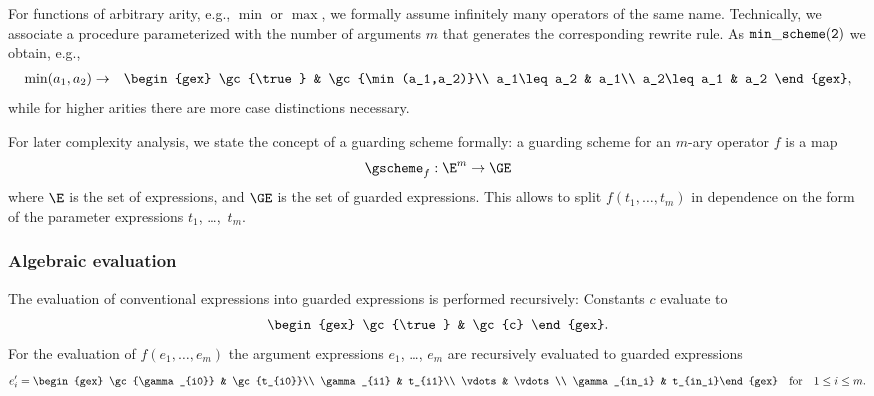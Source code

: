 For functions of arbitrary arity, e.g., $\min$ or $\max$, we formally
assume infinitely many operators of the same name. Technically, we
associate a procedure parameterized with the number of arguments $m$
that generates the corresponding rewrite rule. As ${\tt
min\_scheme(2)}$ we obtain, e.g.,
\begin{eqnarray}
\min(a_1,a_2) & \to &
\begin{gex}
\gc{\true} & \gc{\min(a_1,a_2)}\\
a_1\leq a_2 & a_1\\
a_2\leq a_1 & a_2
\end{gex}\label{binminscheme},
\end{eqnarray}
while for higher arities there are more case distinctions necessary.

For later complexity analysis, we state the concept of a guarding
scheme formally: a guarding scheme for an $m$-ary operator $f$ is a
map
$$
\gscheme_f: \E^m \to \GE
$$
where $\E$ is the set of expressions, and $\GE$ is the set of guarded
expressions. This allows to split $f(t_1,\ldots,t_m)$ in dependence
on the form of the parameter expressions $t_1$, \dots,~$t_m$.
%
\subsubsection{Algebraic evaluation}\label{algeval}
The evaluation of conventional expressions into guarded expressions is
performed recursively: Constants $c$ evaluate to
$$
\begin{gex}
\gc{\true} & \gc{c}
\end{gex}.
$$
For the evaluation
of $f(e_1,\ldots,e_m)$ the argument expressions $e_1$, \ldots, $e_m$
are recursively evaluated to guarded expressions
\begin{equation}
e_i'=\begin{gex}
\gc{\gamma_{i0}} & \gc{t_{i0}}\\
\gamma_{i1} & t_{i1}\\
\vdots & \vdots\\
\gamma_{in_i} & t_{in_i}\end{gex}\quad\mbox{for}\quad 1\leq i\leq m.
\label{eprimes}
\end{equation}

